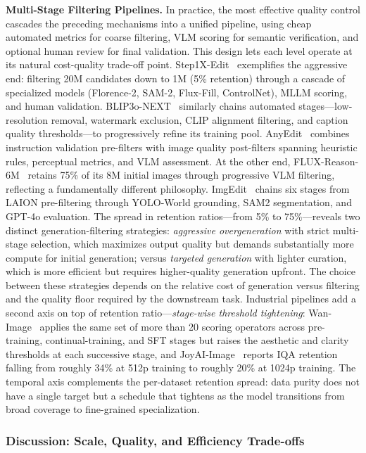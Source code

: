 \documentclass{llmxive}
\begin{document}
\textbf{Multi-Stage Filtering Pipelines.}
In practice, the most effective quality control cascades the preceding mechanisms into a unified pipeline, using cheap automated metrics for coarse filtering, VLM scoring for semantic verification, and optional human review for final validation. This design lets each level operate at its natural cost-quality trade-off point. Step1X-Edit~\citep{liu2025step1x} exemplifies the aggressive end: filtering 20M candidates down to 1M (5\% retention) through a cascade of specialized models (Florence-2, SAM-2, Flux-Fill, ControlNet), MLLM scoring, and human validation. BLIP3o-NEXT~\citep{chen2025blip3o} similarly chains automated stages---low-resolution removal, watermark exclusion, CLIP alignment filtering, and caption quality thresholds---to progressively refine its training pool. AnyEdit~\citep{yu2025anyedit} combines instruction validation pre-filters with image quality post-filters spanning heuristic rules, perceptual metrics, and VLM assessment. At the other end, FLUX-Reason-6M~\citep{fang2025flux} retains 75\% of its 8M initial images through progressive VLM filtering, reflecting a fundamentally different philosophy. ImgEdit~\citep{ye2025imgedit} chains six stages from LAION pre-filtering through YOLO-World grounding, SAM2 segmentation, and GPT-4o evaluation. The spread in retention ratios---from 5\% to 75\%---reveals two distinct generation-filtering strategies: \emph{aggressive overgeneration} with strict multi-stage selection, which maximizes output quality but demands substantially more compute for initial generation; versus \emph{targeted generation} with lighter curation, which is more efficient but requires higher-quality generation upfront. The choice between these strategies depends on the relative cost of generation versus filtering and the quality floor required by the downstream task. Industrial pipelines add a second axis on top of retention ratio---\emph{stage-wise threshold tightening}: Wan-Image~\citep{mao2026wan} applies the same set of more than 20 scoring operators across pre-training, continual-training, and SFT stages but raises the aesthetic and clarity thresholds at each successive stage, and JoyAI-Image~\citep{jdjoyaiimage} reports IQA retention falling from roughly 34\% at 512p training to roughly 20\% at 1024p training. The temporal axis complements the per-dataset retention spread: data purity does not have a single target but a schedule that tightens as the model transitions from broad coverage to fine-grained specialization.

\subsubsection{Discussion: Scale, Quality, and Efficiency Trade-offs}
\label{sec:tradeoffs}
\end{document}
